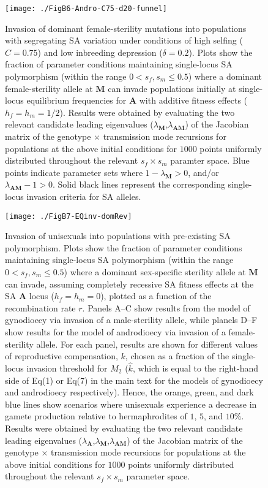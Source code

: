 \documentclass{article}
\begin{document}
\begin{figure}[ht!]
\centering
\texttt{[image: ./FigB6-Andro-C75-d20-funnel]}
\caption{Invasion of dominant female-sterility mutations into populations with segregating SA variation under conditions of high selfing ($C = 0.75$) and low inbreeding depression ($\delta = 0.2$). Plots show the fraction of parameter conditions maintaining single-locus SA polymorphism (within the range $0 < s_f,s_m \leq 0.5$) where a dominant female-sterility allele at $\mathbf{M}$ can invade populations initially at single-locus equilibrium frequencies for $\mathbf{A}$ with additive fitness effects ($h_f=h_m=1/2$). Results were obtained by evaluating the two relevant candidate leading eigenvalues ($\lambda_{\mathbf{M}}$,$\lambda_{\mathbf{AM}}$) of the Jacobian matrix of the genotype $\times$ transmission mode recursions for populations at the above initial conditions for $1000$ points uniformly distributed throughout the relevant $s_f \times s_m$ paramter space. Blue points indicate parameter sets where $1 - \lambda_{\mathbf{M}} > 0$, and/or $\lambda_{\mathbf{AM}} - 1 > 0$. Solid black lines represent the corresponding single-locus invasion criteria for SA alleles.}
\label{fig:AndC75d20Funnel}
\end{figure}
\newpage{}



\begin{figure}[htbp]
\centering
\texttt{[image: ./FigB7-EQinv-domRev]}
\caption{Invasion of unisexuals into populations with pre-existing SA polymorphism. Plots show the fraction of parameter conditions maintaining single-locus SA polymorphism (within the range $0 < s_f,s_m \leq 0.5$) where a dominant sex-specific sterility allele at $\mathbf{M}$ can invade, assuming completely recessive SA fitness effects at the SA $\mathbf{A}$ locus ($h_f=h_m=0$), plotted as a function of the recombination rate $r$. Panels A--C show results from the model of gynodioecy via invasion of a male-sterility allele, while planels D--F show results for the model of androdioecy via invasion of a female-sterility allele. For each panel, results are shown for different values of reproductive compensation, $k$, chosen as a fraction of the single-locus invasion threshold for $M_2$ ($\hat{k}$, which is equal to the right-hand side of Eq(1) or Eq(7) in the main text for the models of gynodioecy and androdioecy respectively). Hence, the orange, green, and dark blue lines show scenarios where unisexuals experience a decrease in gamete production relative to hermaphrodites of $1$, $5$, and $10\%$. Results were obtained by evaluating the two relevant candidate leading eigenvalues ($\lambda_{\mathbf{A}}$,$\lambda_{\mathbf{M}}$,$\lambda_{\mathbf{AM}}$) of the Jacobian matrix of the genotype $\times$ transmission mode recursions for populations at the above initial conditions for $1000$ points uniformly distributed throughout the relevant $s_f \times s_m$ parameter space.}
\label{fig:PrInvDomRev}
\end{figure}
\end{document}
